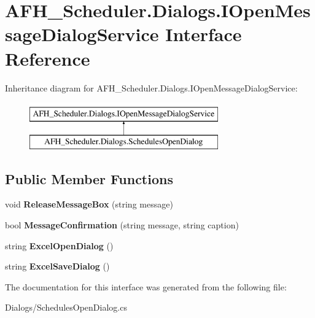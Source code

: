 \section{A\+F\+H\+\_\+\+Scheduler.\+Dialogs.\+I\+Open\+Message\+Dialog\+Service Interface Reference}
\label{interface_a_f_h___scheduler_1_1_dialogs_1_1_i_open_message_dialog_service}
Inheritance diagram for A\+F\+H\+\_\+\+Scheduler.\+Dialogs.\+I\+Open\+Message\+Dialog\+Service\+:\begin{figure}[H]
\begin{center}
\leavevmode
\includegraphics[height=2.000000cm]{interface_a_f_h___scheduler_1_1_dialogs_1_1_i_open_message_dialog_service}
\end{center}
\end{figure}
\subsection*{Public Member Functions}
\begin{DoxyCompactItemize}
\item 
\mbox{\label{interface_a_f_h___scheduler_1_1_dialogs_1_1_i_open_message_dialog_service_a1f06e628f624fd98281ffe4a0e2cbaca}} 
void {\bfseries Release\+Message\+Box} (string message)
\item 
\mbox{\label{interface_a_f_h___scheduler_1_1_dialogs_1_1_i_open_message_dialog_service_afb4e608ff55313b4a0c8dd0de237d0fe}} 
bool {\bfseries Message\+Confirmation} (string message, string caption)
\item 
\mbox{\label{interface_a_f_h___scheduler_1_1_dialogs_1_1_i_open_message_dialog_service_ab629c69070cc79e0810415bf78d04d4f}} 
string {\bfseries Excel\+Open\+Dialog} ()
\item 
\mbox{\label{interface_a_f_h___scheduler_1_1_dialogs_1_1_i_open_message_dialog_service_aabd2626558bb79a33a7efd70b424b751}} 
string {\bfseries Excel\+Save\+Dialog} ()
\end{DoxyCompactItemize}


The documentation for this interface was generated from the following file\+:\begin{DoxyCompactItemize}
\item 
Dialogs/Schedules\+Open\+Dialog.\+cs\end{DoxyCompactItemize}
